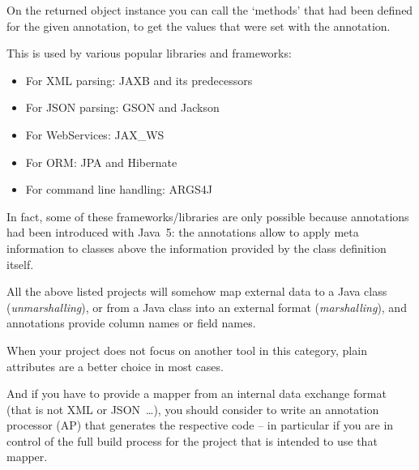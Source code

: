 On the returned object instance you can call the ‘methods’ that had been defined for the given annotation, to get the values that were set with the annotation.

This is used by various popular libraries and frameworks:

\begin{itemize}[nosep]
\item{For XML parsing: JAXB and its predecessors \autocite{ORACLE_DOC_JAXB, ECLIPSE_XML_BINDING}}
\item{For JSON parsing: GSON \autocite{GOOGLE_GSON} and Jackson \autocite{FasterXML:Jackson}}
\item{For WebServices: JAX\_WS \autocite{IBM_JAX_WS, ECLIPSE_XML_SERVICES}}
\item{For ORM: JPA \autocite{ECLIPSE_JPA} and Hibernate \autocite{HIBERNATE_ORM}}
\item{For command line handling: ARGS4J \autocite{Kawaguchi:args4j_github}}
\end{itemize}

In fact, some of these frameworks/libraries are only possible because annotations had been introduced with Java~5: the annotations allow to apply meta information to classes above the information provided by the class definition itself.

All the above listed projects will somehow map external data to a Java class (\textit{unmarshalling}), or from a Java class into an external format (\textit{marshalling}), and annotations provide column names or field names.

When your project does not focus on another tool in this category, plain attributes are a better choice in most cases.

And if you have to provide a mapper from an internal data exchange format (that is not XML or JSON~…), you should consider to write an annotation processor (AP) that generates the respective code – in particular if you are in control of the full build process for the project that is intended to use that mapper.


